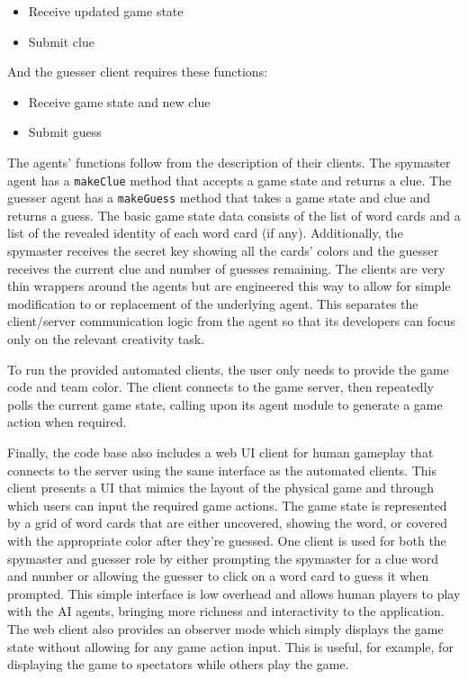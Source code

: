 \documentclass[phd,electronic,oneside,twosidetoc,letterpaper,chaptercenter,parttop,lof]{byumsphd}
\begin{document}
\begin{itemize}
    \setlength{\itemindent}{2em}
    \item Receive updated game state
    \item Submit clue
\end{itemize}

And the guesser client requires these functions:

\begin{itemize}
    \setlength{\itemindent}{2em}
    \item Receive game state and new clue
    \item Submit guess
\end{itemize}

The agents’ functions follow from the description of their clients. 
The spymaster agent has a \texttt{makeClue} method that accepts a game state and returns a clue. 
The guesser agent has a \texttt{makeGuess} method that takes a game state and clue and returns a guess.  The basic game state data consists of the list of word cards and a list of the revealed identity of each word card (if any). Additionally, the spymaster receives the secret key showing all the cards’ colors and the guesser receives the current clue and number of guesses remaining. The clients are very thin wrappers around the agents but are engineered this way to allow for simple modification to or replacement of the underlying agent. This separates the client/server communication logic from the agent so that its developers can focus only on the relevant creativity task.

To run the provided automated clients, the user only needs to provide the game code and team color. The client connects to the game server, then repeatedly polls the current game state, calling upon its agent module to generate a game action when required.

Finally, the code base also includes a web UI client for human gameplay that connects to the server using the same interface as the automated clients. This client presents a UI that mimics the layout of the physical game and through which users can input the required game actions. The game state is represented by a grid of word cards that are either uncovered, showing the word, or covered with the appropriate color after they’re guessed. One client is used for both the spymaster and guesser role by either prompting the spymaster for a clue word and number or allowing the guesser to click on a word card to guess it when prompted. This simple interface is low overhead and allows human players to play with the AI agents, bringing more richness and interactivity to the application. The web client also provides an observer mode which simply displays the game state without allowing for any game action input. This is useful, for example, for displaying the game to spectators while others play the game.
\end{document}
